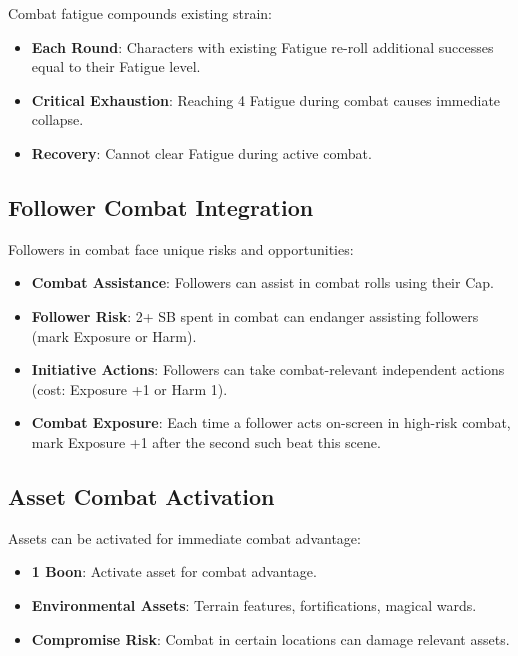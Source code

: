 Combat fatigue compounds existing strain:

\begin{itemize}
    \item \textbf{Each Round}: Characters with existing Fatigue re-roll additional successes equal to their Fatigue level.
    \item \textbf{Critical Exhaustion}: Reaching 4 Fatigue during combat causes immediate collapse.
    \item \textbf{Recovery}: Cannot clear Fatigue during active combat.
\end{itemize}

\subsection*{Follower Combat Integration}

Followers in combat face unique risks and opportunities:

\begin{itemize}
    \item \textbf{Combat Assistance}: Followers can assist in combat rolls using their Cap.
    \item \textbf{Follower Risk}: 2+ SB spent in combat can endanger assisting followers (mark Exposure or Harm).
    \item \textbf{Initiative Actions}: Followers can take combat-relevant independent actions (cost: Exposure +1 or Harm 1).
    \item \textbf{Combat Exposure}: Each time a follower acts on-screen in high-risk combat, mark Exposure +1 after the second such beat this scene.
\end{itemize}

\subsection*{Asset Combat Activation}

Assets can be activated for immediate combat advantage:

\begin{itemize}
    \item \textbf{1 Boon}: Activate asset for combat advantage.
    \item \textbf{Environmental Assets}: Terrain features, fortifications, magical wards.
    \item \textbf{Compromise Risk}: Combat in certain locations can damage relevant assets.
\end{itemize}

